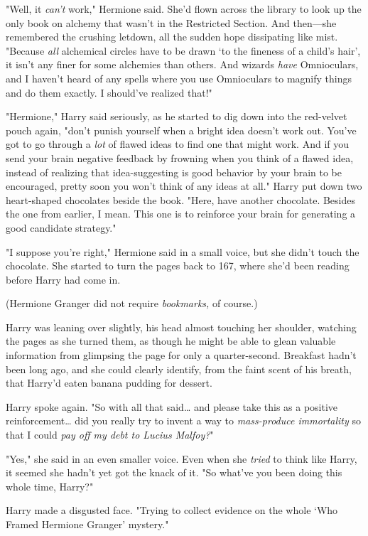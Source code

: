 "Well, it \emph{can't} work," Hermione said. She'd flown across the library to
look up the only book on alchemy that wasn't in the Restricted Section. And
then---she remembered the crushing letdown, all the sudden hope dissipating
like mist. "Because \emph{all} alchemical circles have to be drawn `to the
fineness of a child's hair', it isn't any finer for some alchemies than others.
And wizards \emph{have} Omnioculars, and I haven't heard of any spells where
you use Omnioculars to magnify things and do them exactly. I should've realized
that!"

"Hermione," Harry said seriously, as he started to dig down into the red-velvet
pouch again, "don't punish yourself when a bright idea doesn't work out. You've
got to go through a \emph{lot} of flawed ideas to find one that might work. And
if you send your brain negative feedback by frowning when you think of a flawed
idea, instead of realizing that idea-suggesting is good behavior by your brain
to be encouraged, pretty soon you won't think of any ideas at all." Harry put
down two heart-shaped chocolates beside the book. "Here, have another
chocolate. Besides the one from earlier, I mean. This one is to reinforce your
brain for generating a good candidate strategy."

"I suppose you're right," Hermione said in a small voice, but she didn't touch
the chocolate. She started to turn the pages back to 167, where she'd been
reading before Harry had come in.

(Hermione Granger did not require \emph{bookmarks,} of course.)

Harry was leaning over slightly, his head almost touching her shoulder,
watching the pages as she turned them, as though he might be able to glean
valuable information from glimpsing the page for only a quarter-second.
Breakfast hadn't been long ago, and she could clearly identify, from the faint
scent of his breath, that Harry'd eaten banana pudding for dessert.

Harry spoke again. "So with all that said{\ldots} and please take this as a
positive reinforcement{\ldots} did you really try to invent a way to
\emph{mass-produce immortality} so that I could \emph{pay off my debt to Lucius
Malfoy?}"

"Yes," she said in an even smaller voice. Even when she \emph{tried} to think
like Harry, it seemed she hadn't yet got the knack of it. "So what've you been
doing this whole time, Harry?"

Harry made a disgusted face. "Trying to collect evidence on the whole `Who
Framed Hermione Granger' mystery."

